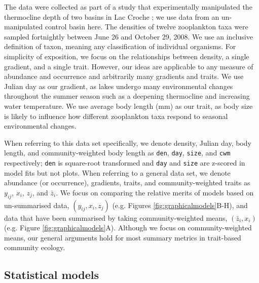 \documentclass[12pt]{ecology}
\begin{document}
The data were collected as part of a study that experimentally manipulated the thermocline depth of two basins in Lac Croche \citep{CantinEtAl2011}; we use data from an un-manipulated control basin here.  The densities of twelve zooplankton taxa were sampled fortnightly between June 26 and October 29, 2008.  We use an inclusive definition of taxon, meaning any classification of individual organisms.  For simplicity of exposition, we focus on the relationships between density, a single gradient, and a single trait.  However, our ideas are applicable to any measure of abundance and occurrence and arbitrarily many gradients and traits.  We use Julian day as our gradient, as lakes undergo many environmental changes throughout the summer season such as a deepening thermocline and increasing water temperature.  We use average body length (mm) as our trait, as body size is likely to influence how different zooplankton taxa respond to seasonal environmental changes.   %

When referring to this data set specifically, we denote density, Julian day, body length, and community-weighted body length as \texttt{den}, \texttt{day}, \texttt{size}, and \texttt{cwm} respectively; \texttt{den} is square-root transformed and \texttt{day} and \texttt{size} are z-scored in model fits but not plots.  When referring to a general data set, we denote abundance (or occurrence), gradients, traits, and community-weighted traits as $y_{ij}$, $x_i$, $z_j$, and $\bar{z}_i$.  We focus on comparing the relative merits of models based on un-summarised data, $(y_{ij}, x_i, z_j)$ (e.g. Figures \ref{fig:graphicalmodels}B-H), and data that have been summarised by taking community-weighted means, $(\bar{z}_i, x_i)$ (e.g. Figure \ref{fig:graphicalmodels}A).  Although we focus on community-weighted means, our general arguments hold for most summary metrics in trait-based community ecology.

\subsection{Statistical models}
\end{document}
